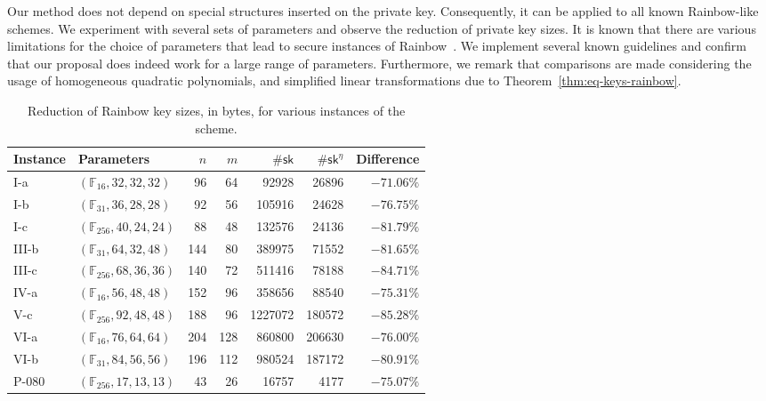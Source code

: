 \documentclass[12pt, a4paper, oneside]{memoir}
\theoremstyle{definition}
\begin{document}
Our method does not depend on special structures inserted on the private key. Consequently, it can be applied to all known Rainbow-like schemes. We experiment with several sets of parameters and observe the reduction of private key sizes. It is known that there are various limitations for the choice of parameters that lead to secure instances of Rainbow~\cite{Petzoldt:201005}. We implement several known guidelines and confirm that our proposal does indeed work for a large range of parameters. Furthermore, we remark that comparisons are made considering the usage of homogeneous quadratic polynomials, and simplified linear transformations due to Theorem~\ref{thm:eq-keys-rainbow}.

\begin{table}[htbp]
  \renewcommand{\arraystretch}{1.2}
  \setlength{\tabcolsep}{6.5pt}
  \centering
  \caption{Reduction of Rainbow key sizes, in bytes, for various instances of the scheme.}\label{tab:eta-diff}
  \begin{tabular}{*{2}{l}*{5}{r}}
    \toprule
    Instance & Parameters & $n$ & $m$ & $\#\mathsf{sk}$ & $\#\mathsf{sk}^{\eta}$ & Difference \\ \midrule
    I-a   & $(\mathbb{F}_{ 16}, 32, 32, 32)$ &  96 &  64 & \num{   92928} & \num{  26896} & $-71.06\%$ \\
    I-b   & $(\mathbb{F}_{ 31}, 36, 28, 28)$ &  92 &  56 & \num{  105916} & \num{  24628} & $-76.75\%$ \\
    I-c   & $(\mathbb{F}_{256}, 40, 24, 24)$ &  88 &  48 & \num{  132576} & \num{  24136} & $-81.79\%$ \\
    III-b & $(\mathbb{F}_{ 31}, 64, 32, 48)$ & 144 &  80 & \num{  389975} & \num{  71552} & $-81.65\%$ \\
    III-c & $(\mathbb{F}_{256}, 68, 36, 36)$ & 140 &  72 & \num{  511416} & \num{  78188} & $-84.71\%$ \\
    IV-a  & $(\mathbb{F}_{ 16}, 56, 48, 48)$ & 152 &  96 & \num{  358656} & \num{  88540} & $-75.31\%$ \\
    V-c   & $(\mathbb{F}_{256}, 92, 48, 48)$ & 188 &  96 & \num{ 1227072} & \num{ 180572} & $-85.28\%$ \\
    VI-a  & $(\mathbb{F}_{ 16}, 76, 64, 64)$ & 204 & 128 & \num{  860800} & \num{ 206630} & $-76.00\%$ \\
    VI-b  & $(\mathbb{F}_{ 31}, 84, 56, 56)$ & 196 & 112 & \num{  980524} & \num{ 187172} & $-80.91\%$ \\
    P-080 & $(\mathbb{F}_{256}, 17, 13, 13)$ &  43 &  26 & \num{   16757} & \num{   4177} & $-75.07\%$ \\

\end{tabular}
\end{table}
\end{document}
